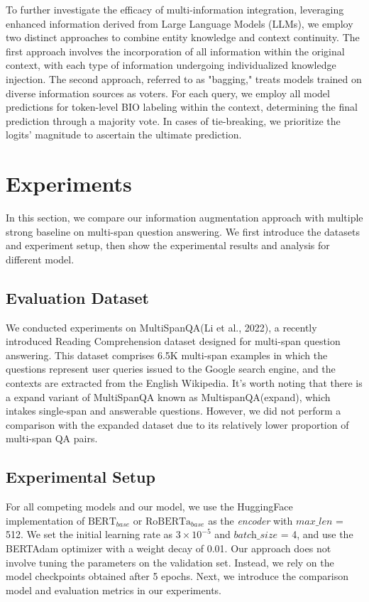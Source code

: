 \documentclass[a4paper,fleqn,twocolumn]{cas-dc}
\newcommand{\1}[1]{\mathds{1}\left[#1\right]}
\begin{document}
	To further investigate the efficacy of multi-information integration, leveraging enhanced information derived from Large Language Models (LLMs), we employ two distinct approaches to combine entity knowledge and context continuity. The first approach involves the incorporation of all information within the original context, with each type of information undergoing individualized knowledge injection. The second approach, referred to as "bagging," treats models trained on diverse information sources as voters. For each query, we employ all model predictions for token-level BIO labeling within the context, determining the final prediction through a majority vote. In cases of tie-breaking, we prioritize the logits' magnitude to ascertain the ultimate prediction.
	

\section{Experiments}
In this section, we compare our information augmentation approach with multiple strong baseline on multi-span question answering. We first introduce the datasets and experiment setup, then show the experimental results and analysis for different model.

\subsection{Evaluation Dataset}
\label{sec:datasets}
	 We conducted experiments on MultiSpanQA(Li et al., 2022), a recently introduced Reading Comprehension dataset designed for multi-span question answering. This dataset comprises 6.5K multi-span examples in which the questions represent user queries issued to the Google search engine, and the contexts are extracted from the English Wikipedia. It's worth noting that there is a expand variant of MultiSpanQA known as MultispanQA(expand), which intakes single-span and answerable questions. However, we did not perform a comparison with the expanded dataset due to its relatively lower proportion of multi-span QA pairs.

\subsection{Experimental Setup}
	For all competing models and our model, we use the HuggingFace implementation of $\text{BERT}_{base}$ or $\text{RoBERTa}_{base}$ as the \textit{encoder} with $\textit{max\_len}$ = 512. We set the initial learning rate as $3 \times 10^{-5}$ and  $\textit{batch\_size}$ = 4, and use the BERTAdam optimizer with a weight decay of 0.01. Our approach does not involve tuning the parameters on the validation set. Instead, we rely on the model checkpoints obtained after 5 epochs. Next, we introduce the comparison model and evaluation metrics in our experiments.
	
\end{document}
